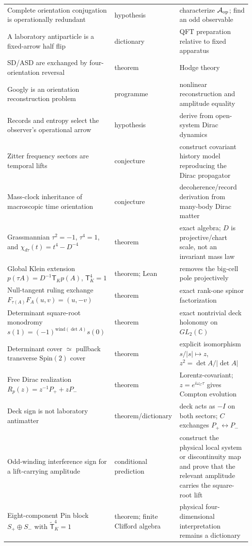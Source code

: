 \documentclass[11pt]{article}
\theoremstyle{definition}\newtheorem{definition}[theorem]{Definition}
\theoremstyle{remark}\newtheorem{remark}[theorem]{Remark}\newtheorem{conjecture}[theorem]{Conjecture}
\begin{document}
\begin{longtable}{>{\raggedright\arraybackslash}p{} >{\raggedright\arraybackslash}p{} >{\raggedright\arraybackslash}p{}}
Complete orientation conjugation is operationally redundant & hypothesis & characterize $\mathcal A_{\rm op}$; find an odd observable\\
A laboratory antiparticle is a fixed-arrow half flip & dictionary & QFT preparation relative to fixed apparatus\\
SD/ASD are exchanged by four-orientation reversal & theorem & Hodge theory\\
Googly is an orientation reconstruction problem & programme & nonlinear reconstruction and amplitude equality\\
Records and entropy select the observer's operational arrow & hypothesis & derive from open-system Dirac dynamics\\
Zitter frequency sectors are temporal lifts & conjecture & construct covariant history model reproducing the Dirac propagator\\
Mass-clock inheritance of macroscopic time orientation & conjecture & decoherence/record derivation from many-body Dirac matter\\
Grassmannian $\tau^2=-1$, $\tau^4=1$, and $\chi_{d\tau}(t)=t^4-D^{-4}$ & theorem & exact algebra; $D$ is projective/chart scale, not an invariant mass law\\
Global Klein extension $p(\tau A)=D^{-1}\mathsf T_Kp(A)$, $\mathsf T_K^4=1$ & theorem; Lean & removes the big-cell pole projectively\\
Null-tangent ruling exchange $F_{\tau(A)}F_A(u,v)=(u,-v)$ & theorem & exact rank-one spinor factorization\\
Determinant square-root monodromy $s(1)=(-1)^{\mathrm{wind}(\det A)}s(0)$ & theorem & exact nontrivial deck holonomy on $GL_2(\mathbb C)$\\
Determinant cover $\simeq$ pullback transverse $\mathrm{Spin}(2)$ cover & theorem & explicit isomorphism $s/|s|\mapsto z$, $z^2=\det A/|\det A|$\\
Free Dirac realization $R_p(z)=z^{-1}P_++zP_-$ & theorem & Lorentz-covariant; $z=e^{i\omega_C\tau}$ gives Compton evolution\\
Deck sign is not laboratory antimatter & theorem/dictionary & deck acts as $-I$ on both sectors; $C$ exchanges $P_+\leftrightarrow P_-$\\
Odd-winding interference sign for a lift-carrying amplitude & conditional prediction & construct the physical local system or discontinuity map and prove that the relevant amplitude carries the square-root lift\\
Eight-component Pin block $S_+\oplus S_-$ with $\widetilde{\mathsf T}_K^4=1$ & theorem; finite Clifford algebra & physical four-dimensional interpretation remains a dictionary\\

\end{longtable}
\end{document}

